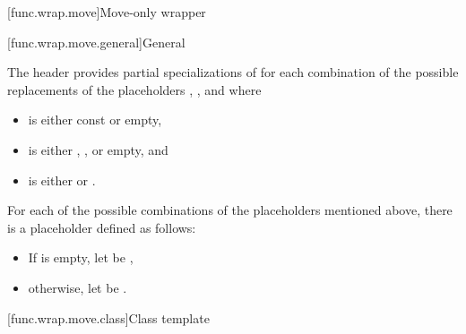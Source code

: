[func.wrap.move]{Move-only wrapper}

[func.wrap.move.general]{General}

\pnum
The header provides partial specializations of 
for each combination of the possible replacements
of the placeholders \cv{}, , and  where
\begin{itemize}
\item
\cv{} is either const or empty,
\item
{} is either \tcode{\&}, \tcode{\&\&}, or empty, and
\item
{} is either  or .
\end{itemize}

\pnum
For each of the possible combinations of the placeholders mentioned above,
there is a placeholder  defined as follows:
\begin{itemize}
\item
If  is empty, let  be \cv{}\tcode{\&},
\item
otherwise, let  be \cv{} .
\end{itemize}

[func.wrap.move.class]{Class template }

